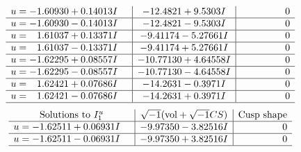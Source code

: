 \documentclass[1p]{elsarticle_modified}
\theoremstyle{definition}
\newcommand{\I}{\sqrt{-1}}
\begin{document}
$$\begin{array}{c|c|c}
\begin{aligned}
u &= -1.60930 + 0.14013 I\end{aligned}
 & -12.4821 + 9.5303 I & \phantom{-0.000000 } 0 \\ \hline\begin{aligned}
u &= -1.60930 - 0.14013 I\end{aligned}
 & -12.4821 - 9.5303 I & \phantom{-0.000000 } 0 \\ \hline\begin{aligned}
u &= \phantom{-}1.61037 + 0.13371 I\end{aligned}
 & -9.41174 - 5.27661 I & \phantom{-0.000000 } 0 \\ \hline\begin{aligned}
u &= \phantom{-}1.61037 - 0.13371 I\end{aligned}
 & -9.41174 + 5.27661 I & \phantom{-0.000000 } 0 \\ \hline\begin{aligned}
u &= -1.62295 + 0.08557 I\end{aligned}
 & -10.77130 + 4.64558 I & \phantom{-0.000000 } 0 \\ \hline\begin{aligned}
u &= -1.62295 - 0.08557 I\end{aligned}
 & -10.77130 - 4.64558 I & \phantom{-0.000000 } 0 \\ \hline\begin{aligned}
u &= \phantom{-}1.62421 + 0.07686 I\end{aligned}
 & -14.2631 - 0.3971 I & \phantom{-0.000000 } 0 \\ \hline\begin{aligned}
u &= \phantom{-}1.62421 - 0.07686 I\end{aligned}
 & -14.2631 + 0.3971 I & \phantom{-0.000000 } 0\\
 \hline 
 \end{array}$$\newpage$$\begin{array}{c|c|c}  
\text{Solutions to }I^u_{1}& \I (\text{vol} + \sqrt{-1}CS) & \text{Cusp shape}\\
 \hline 
\begin{aligned}
u &= -1.62511 + 0.06931 I\end{aligned}
 & -9.97350 - 3.82516 I & \phantom{-0.000000 } 0 \\ \hline\begin{aligned}
u &= -1.62511 - 0.06931 I\end{aligned}
 & -9.97350 + 3.82516 I & \phantom{-0.000000 } 0\\
 \hline 
 \end{array}$$\newpage
\end{document}
